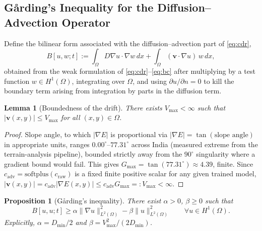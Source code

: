 \documentclass[journal]{IEEEtran}
\newtheorem{lemma}{Lemma}
\newtheorem{proposition}{Proposition}
\begin{document}
\subsection{Gårding's Inequality for the Diffusion--Advection Operator}
\label{app:advection}

Define the bilinear form associated with the diffusion--advection part of \eqref{eq:cdr},
\begin{equation}
B[u,w;t] := \int_\Omega D\nabla u\cdot\nabla w\,dx + \int_\Omega (\mathbf{v}\cdot\nabla u)\,w\,dx,
\end{equation}
obtained from the weak formulation of \eqref{eq:cdr}--\eqref{eq:bc} after multiplying by a test function $w\in H^1(\Omega)$, integrating over $\Omega$, and using $\partial u/\partial n=0$ to kill the boundary term arising from integration by parts in the diffusion term.

\begin{lemma}[Boundedness of the drift]
\label{lem:v_bound}
There exists $V_{\max}<\infty$ such that $|\mathbf{v}(x,y)|\leq V_{\max}$ for all $(x,y)\in\Omega$.
\end{lemma}

\begin{proof}
Slope angle, to which $|\nabla E|$ is proportional via $|\nabla E|=\tan(\text{slope angle})$ in appropriate units, ranges $0.00^{\circ}$--$77.31^{\circ}$ across India (measured extreme from the terrain-analysis pipeline), bounded strictly away from the $90^{\circ}$ singularity where a gradient bound would fail. This gives $G_{\max}=\tan(77.31^{\circ})\approx4.39$, finite. Since $c_{\mathrm{adv}}=\mathrm{softplus}(c_{\mathrm{raw}})$ is a fixed finite positive scalar for any given trained model, $|\mathbf{v}(x,y)|=c_{\mathrm{adv}}|\nabla E(x,y)|\leq c_{\mathrm{adv}}G_{\max}=:V_{\max}<\infty$.
\end{proof}

\begin{proposition}[Gårding's inequality]
\label{prop:garding}
There exist $\alpha>0$, $\beta\geq0$ such that
\begin{equation}
B[u,u;t]\geq \alpha\|\nabla u\|^2_{L^2(\Omega)} - \beta\|u\|^2_{L^2(\Omega)} \qquad \forall u\in H^1(\Omega).
\end{equation}
Explicitly, $\alpha=D_{\min}/2$ and $\beta=V_{\max}^2/(2D_{\min})$.
\end{proposition}
\end{document}
